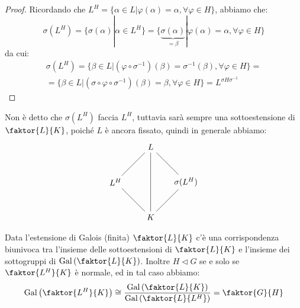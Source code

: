 \documentclass[11pt]{scrartcl}
\begin{document}
\begin{proof}
    Ricordando che $L^H = \{\alpha \in L | \varphi(\alpha) = \alpha, \forall \varphi \in H\}$, abbiamo che:
\[ \sigma(L^H) = \{\sigma(\alpha) | \alpha \in L^H\} = \{\underbrace{\sigma(\alpha)}_{= \beta} | \varphi(\alpha) = \alpha, \forall \varphi \in H\}
        \]
da cui:
\begin{multline*}
    \sigma(L^H) = \{\beta \in L | (\varphi \circ \sigma^{-1})(\beta) = \sigma^{-1}(\beta), \forall \varphi \in H\} = \\ 
    = \{\beta \in L | (\sigma \circ \varphi \circ \sigma^{-1})(\beta) = \beta, \forall \varphi \in H\} = L^{\sigma H \sigma^{-1}}
\end{multline*}
\end{proof}

\begin{remark}
    Non è detto che $\sigma(L^H)$ faccia $L^H$, tuttavia sarà sempre una sottoestensione di $\faktor{L}{K}$, poiché $L$ è ancora fissato,
    quindi in generale abbiamo:
    \[\begin{tikzpicture}
        \node (Q1) at (0,0) {$K$};
        \node (Q2) at (1.5,1.5) {$\sigma(L^H)$};
        \node (Q3) at (0,3) {$L$};
        \node (Q4) at (-1.5,1.5) {$L^H$};
        \draw (Q1)--(Q2) node [pos=0.7, below,inner sep=0.25cm] {};
        \draw (Q1)--(Q4) node [pos=0.7, below,inner sep=0.25cm] {};
        \draw (Q3)--(Q4) node [pos=0.7, above] {};
        \draw (Q2)--(Q3) node [pos=0.3, above] {};
        \draw (Q1)--(Q3) node [pos=0.7, below, right,inner sep=0.25cm, yshift=-0.4cm] {};
        \end{tikzpicture}
        \] 
\end{remark}

\begin{theorem}
    \label{corrG}
    Data l'estensione di Galois (finita) $\faktor{L}{K}$ c'è una corrispondenza biunivoca tra l'insieme delle sottoestensioni di $\faktor{L}{K}$ e l'insieme dei sottogruppi di $\Gal\left(\faktor{L}{K}\right)$. Inoltre $H \triangleleft G$ se e solo se 
    $\faktor{L^H}{K}$ è normale, ed in tal caso abbiamo:
    \[ \Gal\left(\faktor{L^H}{K}\right) \cong \frac{\Gal\left(\faktor{L}{K}\right)}{\Gal\left(\faktor{L}{L^H}\right)} = \faktor{G}{H}
        \]
\end{theorem}
\end{document}
